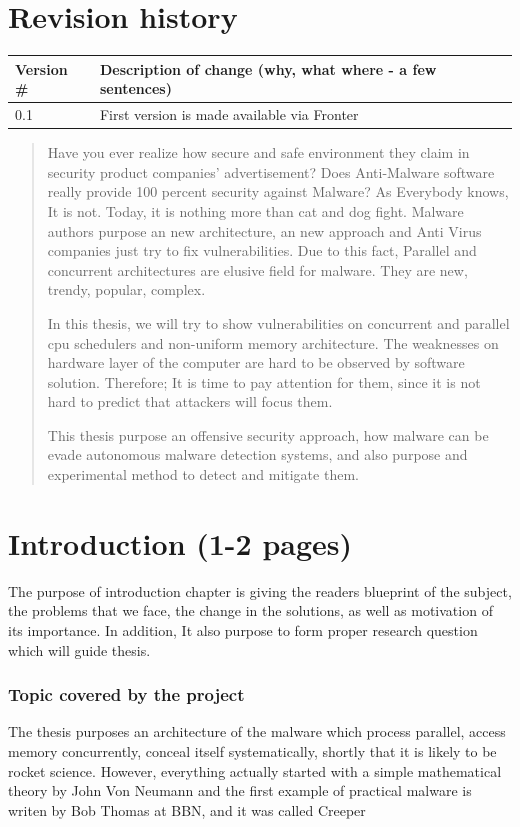 \chapter*{Revision history}

\begin{center}
\begin{tabular}[H]{|l|p{35em}|}
\hline
Version \#  & Description of change (why, what where - a few sentences)\\
\hline
      0.1   & First version is made available via Fronter\\
\hline
\end{tabular}
\end{center}
\newpage

\begin{abstract}
Have you ever realize how secure and safe environment they claim in security product companies' advertisement? Does Anti-Malware software really provide 100 percent security against Malware? As Everybody knows, It is not. Today, it is nothing more than cat and dog fight. Malware authors purpose an new architecture, an new approach and Anti Virus companies just try to fix vulnerabilities. Due to this fact, Parallel and concurrent architectures are elusive field for malware. They are new, trendy, popular, complex. 

In this thesis, we will try to show vulnerabilities on concurrent and parallel cpu schedulers and non-uniform memory architecture. The weaknesses on hardware layer of the computer are hard to be observed by software solution. Therefore; It is time to pay attention for them, since it is not hard to predict that attackers will focus them.

This thesis purpose an offensive security approach, how malware can be evade autonomous malware detection systems, and also purpose and experimental method to detect and mitigate them.
\end{abstract}
\tableofcontents

\chapter{Introduction (1-2 pages)}
The purpose of introduction chapter is giving the readers blueprint of the subject, the problems that we face, the change in the solutions, as well as motivation of its importance. In addition, It also purpose to form proper research question which will guide thesis. 

\subsection{Topic covered by the project}
The thesis purposes an architecture of the malware which process parallel, access memory concurrently, conceal itself systematically, shortly that it is likely to be rocket science. However, everything actually started with a simple mathematical theory by John Von Neumann \cite{von1966theory} and the first example of practical malware is writen by Bob Thomas at BBN, and it was called Creeper 

